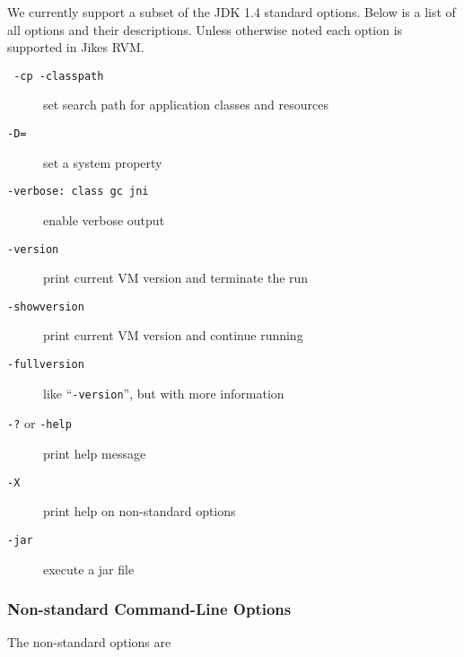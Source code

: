 We currently support a subset of the JDK 1.4 standard options.  Below
is a list of all options and their descriptions.  Unless otherwise noted each
option is supported in Jikes RVM.\@
\begin{description}
\item[{\tt \Mlbr{} -cp \Mor{} -classpath \Mrbr{} }]
set search path for application classes and resources

\item[{\tt -D=}] set a system property

\item[{\tt -verbose:\Mlsq{} class \Mor{} gc \Mor{} jni \Mrsq}]
enable verbose output

\item[{\tt -version}] print current VM version and terminate the run

\item[{\tt -showversion}] print current VM version and continue running

\item[{\tt -fullversion}] like ``{\tt -version}'', but with more information

\item[{\tt -?} or {\tt -help}] print help message

\item[{\tt -X}] print help on non-standard options

\item[{\tt -jar}] execute a jar file 

\end{description}

\subsubsection{Non-standard Command-Line Options}

The non-standard options are

